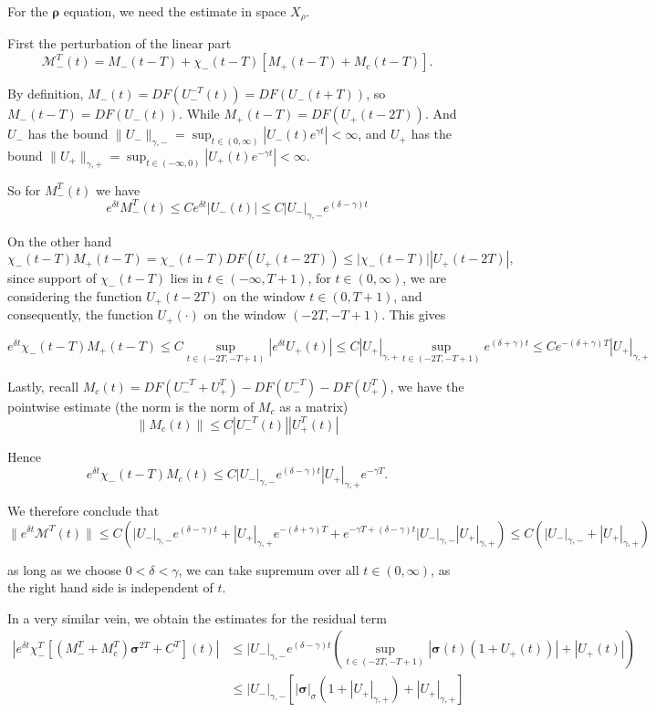 \documentclass[letterpaper,11pt]{article}
\newcommand{\Rho}{\bm{\rho}}
\newcommand{\bigma}{\bm{\sigma}}
\numberwithin{equation}{section}
\theoremstyle{plain}
\begin{document}
For the $\Rho$ equation, we need the estimate in space $X_\rho$.

First the perturbation of the linear part
\[
\mathcal{M}^T_-(t) = M_-(t-T)+\chi_-(t-T)[M_+(t-T)+M_c(t-T)].
\]


By definition, $M_-(t) = DF(U_-^{-T}(t))=DF(U_-(t+T))$, so $M_-(t-T) = DF(U_-(t))$. While $M_+(t-T) = DF(U_+(t-2T))$. And $U_-$ has the bound $\|U_-\|_{\gamma,-} = \sup_{t \in (0,\infty)} |U_-(t)e^{\gamma t}|< \infty$, and $U_+$ has the bound $\|U_+\|_{\gamma,+} = \sup_{t \in (-\infty,0)} |U_+(t)e^{-\gamma t}|< \infty$.



So for $M_-^T(t)$ we have
\[
e^{\delta t}M_-^T(t) \le C e^{\delta t}|U_-(t)| \le C|U_-|_{\gamma,-}e^{(\delta-\gamma)t}
\]




On the other hand
\[
\chi_-(t-T)M_+(t-T) =\chi_-(t-T) DF(U_+(t-2T)) \le |\chi_-(t-T)||U_+(t-2T)|,
\]
since support of $\chi_-(t-T)$ lies in $t \in (-\infty, T+1)$, for $t \in (0,\infty)$, we are considering the function $U_+(t-2T)$ on the window $t \in (0, T+1)$, and consequently, the function $U_+(\cdot)$ on the window $(-2T, -T+1)$.
This gives

\[
e^{\delta t}\chi_-(t-T)M_+(t-T) \le C\sup_{t \in (-2T,-T+1)} |e^{\delta t}U_+(t)| \le C|U_+|_{\gamma,+} \sup_{t \in (-2T,-T+1)} e^{(\delta+\gamma) t} \le Ce^{-(\delta+\gamma)T}|U_+|_{\gamma,+}
\] 

Lastly, recall $M_c(t) = DF(U_-^{-T}+U_+^T)-DF(U_-^{-T})-DF(U_+^T)$, we have the pointwise estimate (the norm is the norm of $M_c$ as a matrix)
\[
\|M_c(t)\|  \le  C|U_-^{-T}(t) | |U_+^T(t) |
\]

Hence
\[
e^{\delta t}\chi_-(t-T)M_c(t) \le C|U_-|_{\gamma,-}e^{(\delta-\gamma)t} |U_+|_{\gamma,+}e^{-\gamma T}.
\]

We therefore conclude that
\[
\|e^{\delta t} \mathcal{M}^T(t)\| \le C(|U_-|_{\gamma,-}e^{(\delta-\gamma)t} + |U_+|_{\gamma,+}e^{-(\delta+\gamma)T}+e^{-\gamma T+(\delta-\gamma)t}|U_-|_{\gamma,-}|U_+|_{\gamma,+}) \le C(|U_-|_{\gamma,-}+|U_+|_{\gamma,+})
\]

as long as we choose $0<\delta<\gamma$, we can take supremum over all $t \in (0,\infty)$, as the right hand side is independent of $t$.

In a very similar vein, we obtain the estimates for the residual term
\begin{align*}
\left|e^{\delta t}\chi_-^T[(M_-^T+M_c^T)\bigma^{2T}+C^T] (t)\right| &\le |U_-|_{\gamma,-}e^{(\delta-\gamma)t}\left( \sup_{t \in (-2T,-T+1)} |\bigma(t)(1+U_+(t))| +|U_+(t)|\right)\\
& \le |U_-|_{\gamma,-} [|\bigma|_{\sigma}(1+|U_+|_{\gamma,+})+|U_+|_{\gamma,+}]
\end{align*}
\end{document}
